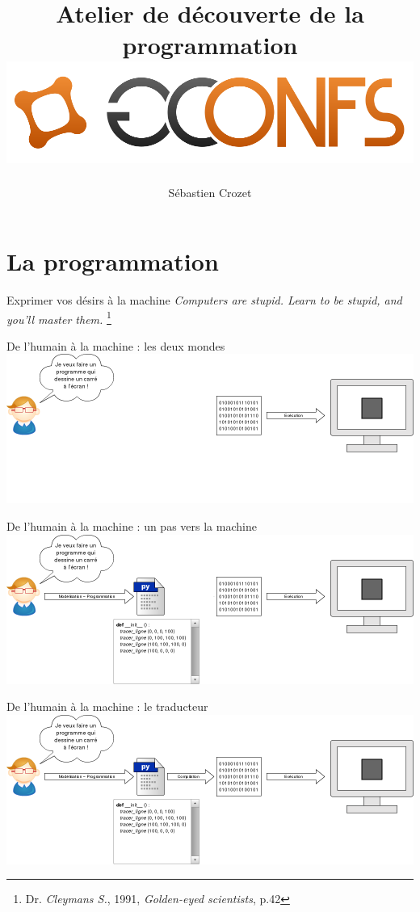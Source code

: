 \documentclass{beamer}
\author{Sébastien Crozet}
\title[Journée de découverte des métiers de l’ingénieur]{Atelier de découverte
de la programmation\\
\includegraphics[scale=0.2]{img/gconfs}
}
\begin{document}
\maketitle
\section{La programmation}
\begin{frame}{Exprimer vos désirs à la machine}
\emph{Computers are stupid. Learn to be stupid, and you’ll master them.}
\footnote{Dr. \textit{Cleymans S.}, 1991, \textit{Golden-eyed
scientists}, p.42}
\end{frame}
\begin{frame}{De l’humain à la machine : les deux mondes}
    \includegraphics[scale=0.3]{img/cacoo0}
\end{frame}
\begin{frame}{De l’humain à la machine : un pas vers la machine}
    \includegraphics[scale=0.3]{img/cacoo1}
\end{frame}
\begin{frame}{De l’humain à la machine : le traducteur}
    \includegraphics[scale=0.3]{img/cacoo}
\end{frame}
\end{document}
